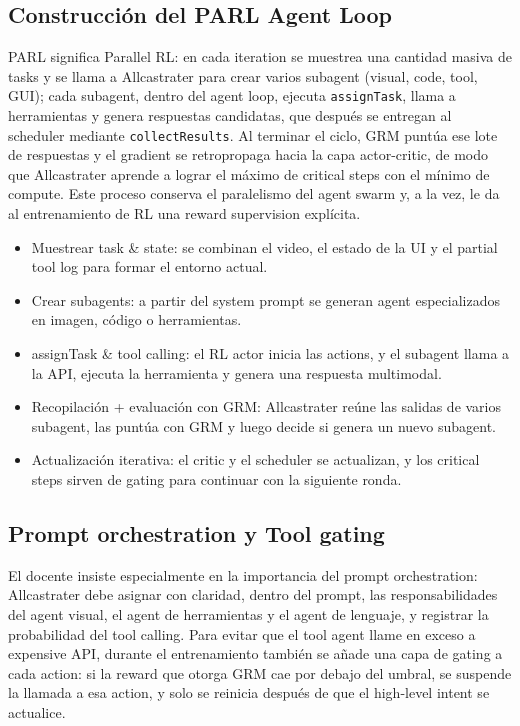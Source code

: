 \documentclass[a4paper]{article}
\begin{document}
\subsection{Construcción del PARL Agent Loop}
PARL significa Parallel RL: en cada iteration se muestrea una cantidad masiva de tasks y se llama a Allcastrater para crear varios subagent (visual, code, tool, GUI); cada subagent, dentro del agent loop, ejecuta \texttt{assignTask}, llama a herramientas y genera respuestas candidatas, que después se entregan al scheduler mediante \texttt{collectResults}. Al terminar el ciclo, GRM puntúa ese lote de respuestas y el gradient se retropropaga hacia la capa actor-critic, de modo que Allcastrater aprende a lograr el máximo de critical steps con el mínimo de compute. Este proceso conserva el paralelismo del agent swarm y, a la vez, le da al entrenamiento de RL una reward supervision explícita.
\begin{itemize}
    \item Muestrear task \& state: se combinan el video, el estado de la UI y el partial tool log para formar el entorno actual.
    \item Crear subagents: a partir del system prompt se generan agent especializados en imagen, código o herramientas.
    \item assignTask \& tool calling: el RL actor inicia las actions, y el subagent llama a la API, ejecuta la herramienta y genera una respuesta multimodal.
    \item Recopilación + evaluación con GRM: Allcastrater reúne las salidas de varios subagent, las puntúa con GRM y luego decide si genera un nuevo subagent.
    \item Actualización iterativa: el critic y el scheduler se actualizan, y los critical steps sirven de gating para continuar con la siguiente ronda.
\end{itemize}

\subsection{Prompt orchestration y Tool gating}
El docente insiste especialmente en la importancia del prompt orchestration: Allcastrater debe asignar con claridad, dentro del prompt, las responsabilidades del agent visual, el agent de herramientas y el agent de lenguaje, y registrar la probabilidad del tool calling. Para evitar que el tool agent llame en exceso a expensive API, durante el entrenamiento también se añade una capa de gating a cada action: si la reward que otorga GRM cae por debajo del umbral, se suspende la llamada a esa action, y solo se reinicia después de que el high-level intent se actualice.
\end{document}
